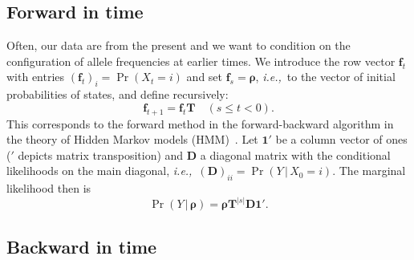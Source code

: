 \documentclass[preprint]{elsarticle}
\newcommand{\bs}[1]{\ensuremath{\boldsymbol{#1}}}
\newcommand\given{{\,|\,}}
\newcommand\eg{{\it e.g.,}}
\newcommand\ie{{\it i.e.,}}
\newcommand\x[1]{\ensuremath{X_{#1}}}
\newcommand\y{\ensuremath{Y}}
\newcommand\s{\ensuremath{s}}
\newcommand\fv[1]{\ensuremath{\mathbf{f}_{#1}}}
\newcommand\oneC{\ensuremath{\mathbf{1}'}}
\begin{document}

\subsection{Forward in time}

Often, our data are from the present and we want to condition on the configuration of allele frequencies at earlier times.  We introduce the row vector $\fv{t}$ with entries $(\fv{t})_{i} = \Pr(X_{t} = i)$ and set $\fv{\s} = \bs{\rho}$, \ie\ to the vector of initial probabilities of states, and define recursively: 
\begin{equation}
\fv{t+1} = \fv{t}\mathbf{T} \quad (\s \le t < 0).
\end{equation}
This corresponds to the forward method in the forward-backward algorithm in the theory of Hidden Markov models (HMM)~\citep[\eg][]{Vogl10}. Let $\oneC$ be a column vector of ones ($'$ depicts matrix transposition) and $\mathbf{D}$ a diagonal matrix with the conditional likelihoods on the main diagonal, \ie\ $(\mathbf{D})_{ii}=\Pr(\y \given \x{0}=i)$. The marginal likelihood then is
\begin{equation}\label{eq:marg_lh}
\Pr(\y \given \bs{\rho}) = \bs{\rho}\mathbf{T}^{|\s|}\mathbf{D}\oneC.
\end{equation}

\subsection{Backward in time}\label{section:backward}
\end{document}
